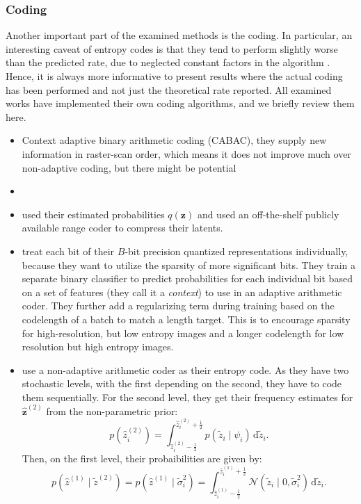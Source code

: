 \documentclass{article}
\renewcommand{\vec}[1]{\mathbf{#1}}
\renewcommand{\d}{\,\text{d}}
\newcommand{\Norm}{\mathcal{N}}
\begin{document}
\subsubsection{Coding}
\par
Another important part of the examined methods is the coding. In particular, an
interesting caveat of entropy codes is that they tend to perform slightly worse
than the predicted rate, due to neglected constant factors in the algorithm
\cite{rissanen1981universal}. Hence, it is always more informative to present
results where the actual coding has been performed and not just the theoretical
rate reported. All examined works have implemented their own coding algorithms,
and we briefly review them here.
\begin{itemize}
\item \cite{balle2016end} Context adaptive binary arithmetic coding (CABAC),
  they supply new information in raster-scan order, which means it does not
  improve much over non-adaptive coding, but there might be potential
\item \cite{toderici2017full}
\item \cite{theis2017lossy} used their estimated probabilities $q(\vec{z})$ and
  used an off-the-shelf publicly available range coder to compress their latents.
\item \cite{rippel2017real} treat each bit of their $B$-bit precision quantized
  representations individually, because they want to utilize the sparsity of
  more significant bits. They train a separate binary classifier to predict
  probabilities for each individual bit based on a set of features (they call
  it a \textit{context}) to use in an adaptive arithmetic coder. They further
  add a regularizing term during training based on the codelength of a batch to
  match a length target. This is to encourage sparsity for high-resolution, but
  low entropy images and a longer codelength for low resolution but high entropy
  images.
\item \cite{balle2018variational} use a non-adaptive arithmetic coder as their
  entropy code. As they have two stochastic levels, with the
  first depending on the second, they have to code them sequentially. For the
  second level, they get their frequency estimates for $\vec{\hat{z}}^{(2)}$
  from the non-parametric prior:
  \[
    p(\hat{z}^{(2)}_i) =
    \int_{\hat{z}^{(2)}_i-\frac{1}{2}}^{\hat{z}^{(2)}_i+\frac{1}{2}}p(\tilde{z}_i \mid \psi_i) \d \tilde{z}_i.
  \]
  Then, on the first level, their probaibilities are given by:
  \[
    p(\hat{z}^{(1)} \mid \tilde{z}^{(2)}) = p(\hat{z}^{(1)} \mid
    \tilde{\sigma}^2_i) = 
    \int_{\hat{z}^{(1)}_i-\frac{1}{2}}^{\hat{z}^{(1)}_i + \frac{1}{2}}\Norm(\tilde{z}_i \mid 0, \tilde{\sigma}^2_i) \d \tilde{z}_i.
  \]

\end{itemize}
\end{document}
